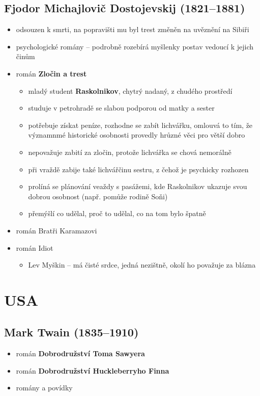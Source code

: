 \subsection{Fjodor Michajlovič Dostojevskij (1821--1881)}
\begin{itemize}
\item odsouzen k smrti, na popravišti mu byl trest změněn na uvěznění na Sibiři
\item psychologické romány -- podrobně rozebírá myšlenky postav vedoucí k jejich činům
\item román \textbf{Zločin a trest}
	\begin{itemize}
	\item mladý student \textbf{Raskolnikov}, chytrý nadaný, z chudého prostředí 
	\item studuje v petrohradě se slabou podporou od matky a sester
	\item potřebuje získat peníze, rozhodne se zabít lichvářku, omlouvá to tím, že významnmé historické osobnosti provedly hrůzné věci pro větší dobro
	\item nepovažuje zabití za zločin, protože lichvářka se chová nemorálně
	\item při vraždě zabije také lichvářčinu sestru, z čehož je psychicky rozhozen
	\item prolíná se plánování veaždy s pasážemi, kde Raskolnikov ukazuje svou dobrou osobnost (např. pomůže rodině Soňi)
	\item přemýšlí co udělal, proč to udělal, co na tom bylo špatně
	\end{itemize}
\item román Bratři Karamazovi
\item román Idiot
	\begin{itemize}
	\item Lev Myškin -- má čisté srdce, jedná nezištně, okolí ho považuje za blázna
	\end{itemize}
\end{itemize}

\section{USA}
\subsection{Mark Twain (1835--1910)}
\begin{itemize}
\item román \textbf{Dobrodružství Toma Sawyera}
\item román \textbf{Dobrodružství Huckleberryho Finna}
\item romány a povídky
\end{itemize}

